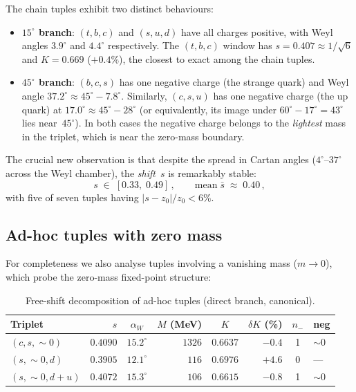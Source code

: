 \documentclass[preprint,12pt]{elsarticle}
\begin{document}
\noindent The chain tuples exhibit two distinct behaviours:
\begin{itemize}
\item \textbf{$15^\circ$ branch}: $(t,b,c)$ and $(s,u,d)$ have
  all charges positive, with Weyl angles $3.9^\circ$ and $4.4^\circ$
  respectively.  The $(t,b,c)$ window has $s = 0.407 \approx 1/\sqrt{6}$
  and $K = 0.669$ ($+0.4\%$), the closest to exact among the
  chain tuples.

\item \textbf{$45^\circ$ branch}: $(b,c,s)$ has one negative charge
  (the strange quark) and Weyl angle $37.2^\circ \approx 45^\circ - 7.8^\circ$.
  Similarly, $(c,s,u)$ has one negative charge (the up quark) at
  $17.0^\circ \approx 45^\circ - 28^\circ$ (or equivalently, its
  image under $60^\circ - 17^\circ = 43^\circ$ lies near~$45^\circ$).
  In both cases the negative charge belongs to the
  \emph{lightest} mass in the triplet, which is near the
  zero-mass boundary.
\end{itemize}

\noindent The crucial new observation is that despite the spread in
Cartan angles ($4^\circ$--$37^\circ$ across the Weyl chamber),
the \emph{shift}~$s$ is remarkably stable:
\begin{equation}
  s \;\in\; [0.33,\; 0.49]\,,\qquad
  \text{mean}\; \bar{s} \;\approx\; 0.40\,,
  \label{eq:s_range}
\end{equation}
with five of seven tuples having $|s - z_0|/z_0 < 6\%$.


\subsection{Ad-hoc tuples with zero mass}

For completeness we also analyse tuples involving a vanishing mass
($m \to 0$), which probe the zero-mass fixed-point structure:

\begin{table}[h]
\centering
\caption{Free-shift decomposition of ad-hoc tuples
(direct branch, canonical).}
\label{tab:adhoc}
{\small
\begin{tabular}{lrcrcrcl}
\toprule
Triplet & $s$ & $\alpha_W$ & $M$ (MeV) & $K$ & $\delta K$ (\%) & $n_-$ & neg \\
\midrule
$(c, s, \sim\!0)$       & $0.4090$ & $15.2^\circ$ & $1326$ & $0.6637$ & $-0.4$ & 1 & ${\sim}0$ \\
$(s, \sim\!0, d)$       & $0.3905$ & $12.1^\circ$ & $116$  & $0.6976$ & $+4.6$ & 0 & --- \\
$(s, \sim\!0, d{+}u)$   & $0.4072$ & $15.3^\circ$ & $106$  & $0.6615$ & $-0.8$ & 1 & ${\sim}0$ \\
\bottomrule
\end{tabular}}
\end{table}
\end{document}
